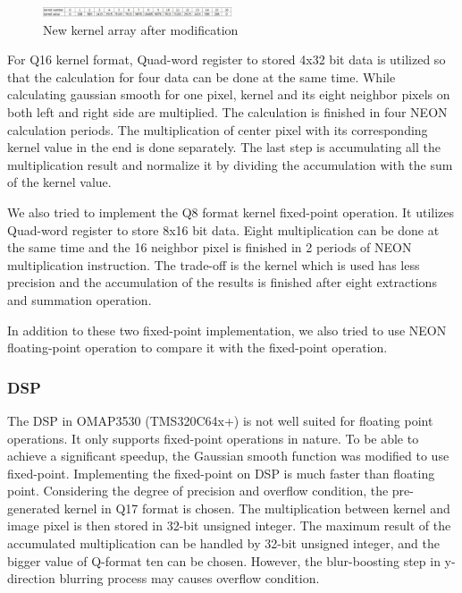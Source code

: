 \documentclass[conference]{IEEEtran}
\begin{document}
\begin{figure}[!ht]
	    \centering
	    \includegraphics[width=0.5\textwidth]{pic/kernel.jpg}
   	\caption{New kernel array after modification}
   	\label{fig:kernel_mod}
   \end{figure}

For Q16 kernel format, Quad-word register to stored 4x32 bit data is utilized so that the calculation for four data can be done at the same time. While calculating gaussian smooth for one pixel, kernel and its eight neighbor pixels on both left and right side are multiplied. The calculation is finished in four NEON calculation periods. The multiplication of center pixel with its corresponding kernel value in the end is done separately. The last step is accumulating all the multiplication result and normalize it by dividing the accumulation with the sum of the kernel value.

We also tried to implement the Q8 format kernel fixed-point operation. It utilizes Quad-word register to store 8x16 bit data. Eight multiplication can be done at the same time and the 16 neighbor pixel is finished in 2 periods of NEON multiplication instruction. The trade-off is the kernel which is used has less precision and the accumulation of the results is finished after eight extractions and summation operation.

In addition to these two fixed-point implementation, we also tried to use NEON floating-point operation to compare it with the fixed-point operation.

\subsubsection{DSP}
The DSP in OMAP3530 (TMS320C64x+) is not well suited for floating point operations. It only supports fixed-point operations in nature. To be able to achieve a significant speedup, the Gaussian smooth function was modified to use fixed-point. Implementing the fixed-point on DSP is much faster than floating point. Considering the degree of precision and overflow condition, the pre-generated kernel in Q17 format is chosen. The multiplication between kernel and image pixel is then stored in 32-bit unsigned integer. The maximum result of the accumulated multiplication can be handled by 32-bit unsigned integer, and the bigger value of Q-format ten can be chosen. However, the blur-boosting step in y-direction blurring process may causes overflow condition.
\end{document}
